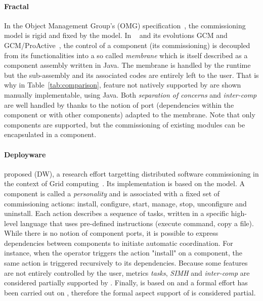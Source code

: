 \paragraph{Fractal}
In the Object Management Group's (OMG)
specification~\cite{ccmdeploy:omg06}, the commissioning model is rigid
and fixed by the model. In \fractal~\cite{Blair2009} and its
evolutions GCM and GCM/ProActive~\cite{baude:hal-01001043}, the
control of a component (\eg its commissioning) is decoupled from its
functionalities into a so called \emph{membrane} which is itself
described as a component assembly written in Java. The membrane is
handled by the \fractal runtime but the sub-assembly and its
associated codes are entirely left to the user. That is why in
Table~\ref{tab:comparison}, feature not natively supported by \fractal
are shown manually implementable, using Java. Both \emph{separation of
  concerns} and \emph{inter-comp} are well handled by \fractal thanks
to the notion of port (dependencies within the component or with other
components) adapted to the membrane. Note that only \fractal
components are supported, but the commissioning of existing
modules can be encapsulated in a \fractal component.

\paragraph{Deployware}
\citeauthor{flissi2008ccgrid} proposed \deployware (DW), a research
effort targetting distributed software commissioning in the context of
Grid computing~\cite{flissi2008ccgrid}. Its implementation is based on
the \fractal model. A component is called a \emph{personality} and is
associated with a fixed set of commissioning actions: install,
configure, start, manage, stop, unconfigure and uninstall. Each action
describes a sequence of tasks, written in a specific high-level
language that uses pre-defined instructions (\eg execute command, copy
a file). While there is no notion of component ports, it is possible
to express dependencies between components to initiate automatic
coordination. For instance, when the operator triggers the action
"install" on a component, the same action is triggered recursively to
its dependencies. Because some features are not entirely controlled by
the user, metrics \emph{tasks}, \emph{SIMH} and \emph{inter-comp} are
considered partially supported by \deployware. Finally, \deployware is
based on \fractal and a formal effort has been carried out on
\fractal, therefore the formal aspect support of \deployware is
considered partial.

